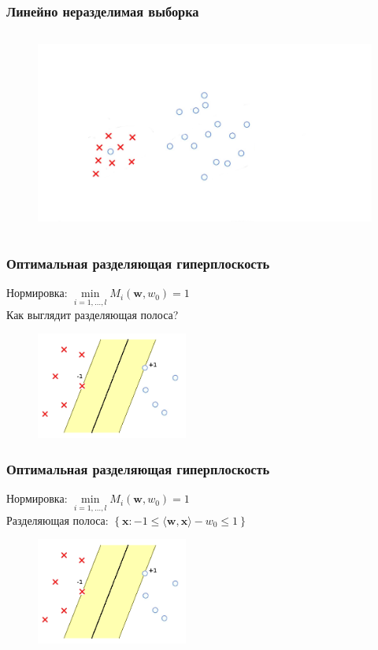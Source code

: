 \documentclass[12pt]{beamer}
\begin{document}
\begin{frame}\frametitle{Линейно неразделимая выборка}
\begin{figure}[htbp]
  \includegraphics[height=190pt, keepaspectratio = true]{images/linearly_unseparable}   
\end{figure}
\end{frame}

\begin{frame}\frametitle{Оптимальная разделяющая гиперплоскость}
Нормировка: $\min\limits_{i = 1, \dots , l} M_i(\mathbf{w}, w_0) = 1$\\
Как выглядит разделяющая полоса?
\begin{figure}[htbp]
  \includegraphics[height=100pt, keepaspectratio = true]{images/linearly_separable3}   
\end{figure}
\end{frame}


\begin{frame}\frametitle{Оптимальная разделяющая гиперплоскость}
Нормировка: $\min\limits_{i = 1, \dots , l} M_i(\mathbf{w}, w_0) = 1$\\
Разделяющая полоса: $\left\{\mathbf{x}: -1 \leq \langle \mathbf{w}, \mathbf{x}\rangle - w_0 \leq 1\right\}$
\begin{figure}[htbp]
  \includegraphics[height=100pt, keepaspectratio = true]{images/linearly_separable3}   
\end{figure}
\end{frame}
\end{document}
